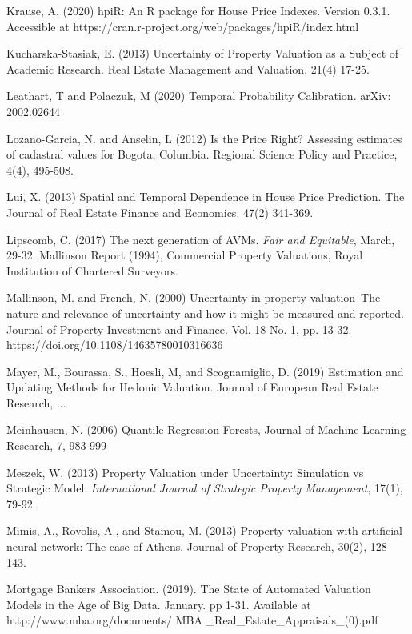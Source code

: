 \documentclass[colTwo]{anon}
\theoremstyle{definition}
\begin{document}
\begin{thebibliography}{50}
\harvarditem{}{}{}Krause, A. (2020) hpiR: An R package for House Price Indexes.  Version 0.3.1.  Accessible at https://cran.r-project.org/web/packages/hpiR/index.html

\harvarditem{}{}{}Kucharska-Stasiak, E. (2013) Uncertainty of Property Valuation as a Subject of Academic Research. Real Estate Management and Valuation, 21(4) 17-25.

\harvarditem{}{}{}Leathart, T and Polaczuk, M  (2020) Temporal Probability Calibration. arXiv: 2002.02644

\harvarditem{}{}{}Lozano-Garcia, N. and Anselin, L (2012) Is the Price Right?  Assessing estimates of cadastral values for Bogota, Columbia. Regional Science Policy and Practice, 4(4), 495-508.

\harvarditem{}{}{}Lui, X. (2013) Spatial and Temporal Dependence in House Price Prediction. The Journal of Real Estate Finance and Economics. 47(2) 341-369. 
 
\harvarditem{}{}{}Lipscomb, C. (2017) The next generation of AVMs. \textit{Fair and Equitable}, March, 29-32.  
\harvarditem{}{}{}Mallinson Report (1994), Commercial Property Valuations, Royal Institution of Chartered Surveyors.

\harvarditem{}{}{}Mallinson, M. and French, N. (2000) Uncertainty in property valuation--The nature and relevance of uncertainty and how it might be measured and reported. Journal of Property Investment and Finance. Vol. 18 No. 1, pp. 13-32. https://doi.org/10.1108/14635780010316636

\harvarditem{}{}{}Mayer, M., Bourassa, S., Hoesli, M, and Scognamiglio, D. (2019) Estimation and Updating Methods for Hedonic Valuation. Journal of European Real Estate Research, ...

\harvarditem{}{}{}Meinhausen, N.  (2006) Quantile Regression Forests, Journal of Machine Learning Research, 7, 983-999

\harvarditem{}{}{}Meszek, W. (2013) Property Valuation under Uncertainty: Simulation vs Strategic Model. \textit{International Journal of Strategic Property Management}, 17(1), 79-92. 

\harvarditem{}{}{}Mimis, A., Rovolis, A., and Stamou, M. (2013) Property valuation with artificial neural network: The case of Athens. Journal of Property Research, 30(2), 128-143. 

\harvarditem{}{}{}Mortgage Bankers Association. (2019). The State of Automated Valuation Models in the Age of Big Data. January. pp 1-31. Available at http://www.mba.org/documents/ MBA \_Real\_Estate\_Appraisals\_(0).pdf


\end{thebibliography}
\end{document}
